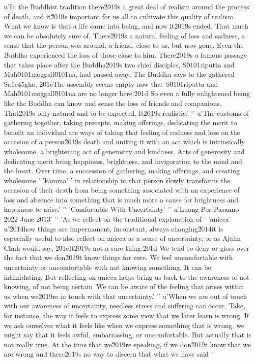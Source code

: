 u'In the Buddhist tradition there\u2019s a great deal of realism around the process of death, and it\u2019s important for us all to cultivate this quality of realism. What we know is that a life came into being, and now it\u2019s ended. That much we can be absolutely sure of. There\u2019s a natural feeling of loss and sadness, a sense that the person was around, a friend, close to us, but now gone. Even the Buddha experienced the loss of those close to him. There\u2019s a famous passage that takes place after the Buddha\u2019s two chief disciples, S\u0101riputta and Mah\u0101moggall\u0101na, had passed away. The Buddha says to the gathered Sa\u1e45gha, \u201cThe assembly seems empty now that S\u0101riputta and Mah\u0101moggall\u0101na are no longer here.\u201d So even a fully enlightened being like the Buddha can know and sense the loss of friends and companions. That\u2019s only natural and to be expected. It\u2019s realistic.'
'\n'
u'The customs of gathering together, taking precepts, making offerings, dedicating the merit to benefit an individual are ways of taking that feeling of sadness and loss on the occasion of a person\u2019s death and uniting it with an act which is intrinsically wholesome, a brightening act of generosity and kindness. Acts of generosity and dedicating merit bring happiness, brightness, and invigoration to the mind and the heart. Over time, a succession of gathering, making offerings, and creating wholesome '
'kamma'
' in relationship to that person slowly transforms the occasion of their death from being something associated with an experience of loss and absence into something that is much more a cause for brightness and happiness to arise.'
'\n'
'Comfortable With Uncertainty'
'\n'
u'Luang Por Pasanno \u2022 June 2013'
'\n'
'As we reflect on the traditional explanation of '
'anicca'
u'\u2014how things are impermanent, inconstant, always changing\u2014it is especially useful to also reflect on anicca as a sense of uncertainty, or as Ajahn Chah would say, \u201cIt\u2019s not a sure thing.\u201d We tend to deny or gloss over the fact that we don\u2019t know things for sure. We feel uncomfortable with uncertainty or uncomfortable with not knowing something. It can be intimidating. But reflecting on anicca helps bring us back to the awareness of not knowing, of not being certain. We can be aware of the feeling that arises within us when we\u2019re in touch with that uncertainty.'
'\n'
u'When we are out of touch with our awareness of uncertainty, needless stress and suffering can occur. Take, for instance, the way it feels to express some view that we later learn is wrong. If we ask ourselves what it feels like when we express something that is wrong, we might say that it feels awful, embarrassing, or uncomfortable. But actually that is not really true. At the time that we\u2019re speaking, if we don\u2019t know that we are wrong and there\u2019s no way to discern that what we have said '
